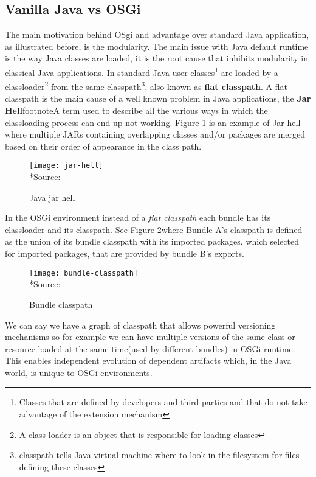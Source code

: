 \subsection{Vanilla Java vs OSGi}
The main motivation behind OSgi and advantage over standard Java application, as illustrated before, is the modularity. The main issue with Java default runtime is the way Java classes are loaded, it is the root cause that inhibits modularity in classical Java applications. In standard Java user classes\footnote{Classes that are defined by developers and third parties and that do not take advantage of the extension mechanism} are loaded by a classloader\footnote{A class loader is an object that is responsible for loading classes} from the same classpath\footnote{classpath tells Java virtual machine where to look in the filesystem for files defining these classes}, also known as \textbf{flat classpath}. A flat classpath is the main cause of a well known problem in Java applications, the \textbf{Jar Hell}footnote{A term used to describe all the various ways in which the classloading process can end up not working}. Figure \ref{jar hell} is an example of Jar hell where multiple JARs containing overlapping classes and/or packages are merged based on their order of appearance in the class path.


\begin{figure}[h]
\caption{Java jar hell}
\label{jar hell}
\centering
\texttt{[image: jar-hell]}
\\*Source: \cite[p. 7]{Hall 2011}
\end{figure}  
\FloatBarrier


 In the OSGi environment instead of a \emph{flat classpath} each bundle has its classloader and its classpath. See Figure \ref{bundle classpath}where Bundle A’s classpath is defined as the union of its bundle classpath with its imported packages, which selected for imported packages, that are provided by bundle B’s exports.


\begin{figure}[h]
\caption{Bundle classpath}
\label{bundle classpath}
\centering
\texttt{[image: bundle-classpath]}
\\*Source: \cite[p. 59]{Hall 2011}
\end{figure}  
\FloatBarrier

We can say we have a graph of classpath that allows powerful versioning mechanisms so for example we can have multiple versions of the same class or resource loaded at the same time(used by different bundles) in OSGi runtime. This enables independent evolution of dependent artifacts which, in the Java world, is unique to OSGi environments\citep{semantic versioning 2010}.   

